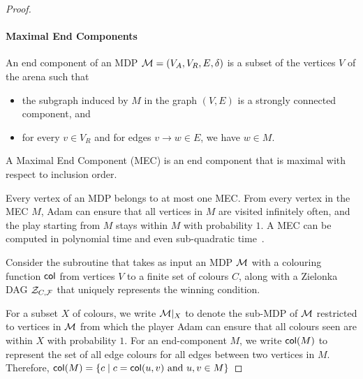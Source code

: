 \begin{proof}
        \paragraph*{Maximal End Components} An end component
        of an MDP $\mathcal{M} = (V_A,V_R, E,\delta)$ is a subset of the vertices $V$ of the arena such that 
        \begin{itemize}
            \item the subgraph induced by $M$ in the graph $(V,E)$ is a strongly connected component, and
            \item for every $v\in V_R$ and for edges $v\rightarrow w\in E$, we have $w\in M$.
        \end{itemize}
        A Maximal End Component (MEC) is an end component that is maximal with respect to inclusion order. 
        
        Every vertex of an MDP belongs to at most one MEC. From every vertex in the MEC $M$, Adam can ensure that all vertices in $M$ are visited infinitely often, and the play starting from $M$ stays within $M$ with probability $1$. A MEC can be computed in polynomial time and even sub-quadratic time~\cite{CH11}.
        
        Consider the subroutine that takes as input an MDP $\mathcal{M}$ with a colouring function ${\mathsf{col}}$ from vertices $V$ to a finite set of colours $C$, along with a Zielonka DAG $\mathcal{Z}_{C,\mathcal{F}}$ that uniquely represents the winning condition. 

        For a subset $X$ of colours, we write $\mathcal{M}|_X$ to denote the sub-MDP of $\mathcal{M}$ restricted to vertices in $\mathcal{M}$ from which the player Adam can ensure that all colours seen are within $X$ with probability $1$.  
        For an end-component $M$, we write ${\mathsf{col}}(M)$ to represent the set of all edge colours for all edges between two vertices in $M$. Therefore, ${\mathsf{col}}(M) = \{c\mid c= {\mathsf{col}}(u,v)\text{ and }u,v\in M\}$


\end{proof}
